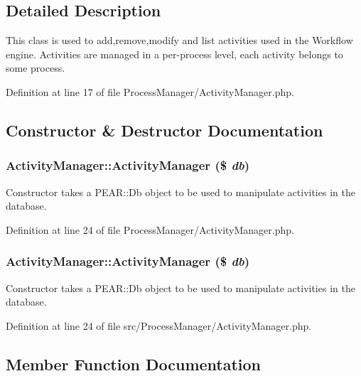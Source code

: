 \subsection{Detailed Description}
This class is used to add,remove,modify and list activities used in the Workflow engine. Activities are managed in a per-process level, each activity belongs to some process. 



Definition at line 17 of file Process\-Manager/Activity\-Manager.php.

\subsection{Constructor \& Destructor Documentation}
\subsubsection{\setlength{\rightskip}{0pt plus 5cm}Activity\-Manager::Activity\-Manager (\$ {\em db})}\label{classActivityManager_a0}


Constructor takes a PEAR::Db object to be used to manipulate activities in the database. 

Definition at line 24 of file Process\-Manager/Activity\-Manager.php.
\subsubsection{\setlength{\rightskip}{0pt plus 5cm}Activity\-Manager::Activity\-Manager (\$ {\em db})}\label{classActivityManager_a16}


Constructor takes a PEAR::Db object to be used to manipulate activities in the database. 

Definition at line 24 of file src/Process\-Manager/Activity\-Manager.php.

\subsection{Member Function Documentation}

